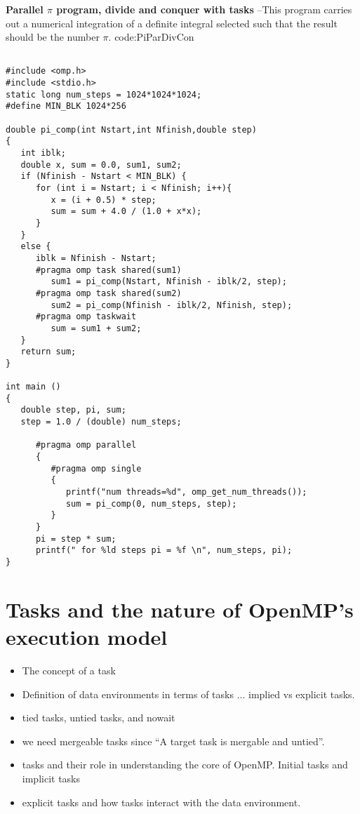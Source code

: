 \begin{CodeExample}%
{\textbf{Parallel $\pi$ program, divide and conquer with tasks} --\small This program carries out a numerical integration 
of a definite integral selected such that the result should be the number $\pi$.
}%
{code:PiParDivCon}
\begin{lstlisting}

#include <omp.h>
#include <stdio.h>
static long num_steps = 1024*1024*1024;
#define MIN_BLK 1024*256

double pi_comp(int Nstart,int Nfinish,double step)
{ 
   int iblk;
   double x, sum = 0.0, sum1, sum2;
   if (Nfinish - Nstart < MIN_BLK) {
      for (int i = Nstart; i < Nfinish; i++){
         x = (i + 0.5) * step;
         sum = sum + 4.0 / (1.0 + x*x); 
      }
   }
   else {
      iblk = Nfinish - Nstart;
      #pragma omp task shared(sum1)
         sum1 = pi_comp(Nstart, Nfinish - iblk/2, step);
      #pragma omp task shared(sum2)
         sum2 = pi_comp(Nfinish - iblk/2, Nfinish, step);
      #pragma omp taskwait
         sum = sum1 + sum2;
   }
   return sum;
}

int main ()
{
   double step, pi, sum;
   step = 1.0 / (double) num_steps;

      #pragma omp parallel 
      {
         #pragma omp single
         {
            printf("num threads=%d", omp_get_num_threads());
            sum = pi_comp(0, num_steps, step);
         }
      }
      pi = step * sum;
      printf(" for %ld steps pi = %f \n", num_steps, pi);
}  
\end{lstlisting}
\end{CodeExample}

\section{Tasks and the nature of OpenMP's execution model}
\label{sec:TasksExecModel}

\begin{itemize}
\item The concept of a task
\item Definition of data environments in terms of tasks ... implied vs explicit tasks.
\item tied tasks, untied tasks, and nowait
\item we need mergeable tasks since ``A target task is mergable and untied''.
\item tasks and their role in understanding the core of OpenMP.  Initial tasks and implicit tasks
\item explicit tasks and how tasks interact with the data environment.
\end{itemize}

